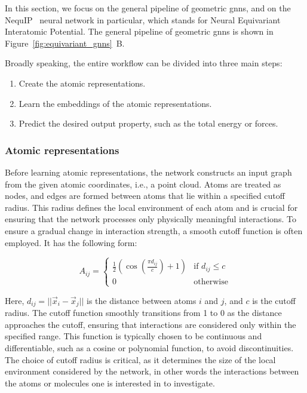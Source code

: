 In this section, we focus on the general pipeline of geometric \acp{gnn}, and on the NequIP~\citep{batznerE3equivariantGraphNeural2022} neural network in particular, which stands for Neural Equivariant Interatomic Potential. The general pipeline of geometric \acp{gnn} is shown in Figure~\ref{fig:equivariant_gnns}~B.

Broadly speaking, the entire workflow can be divided into three main steps:
\begin{enumerate}
    \item Create the atomic representations.
    \item Learn the embeddings of the atomic representations.
    \item Predict the desired output property, such as the total energy or forces.
\end{enumerate}

\subsubsection{Atomic representations}
Before learning atomic representations, the network constructs an input graph from the given atomic coordinates, i.e., a point cloud. Atoms are treated as nodes, and edges are formed between atoms that lie within a specified cutoff radius. This radius defines the local environment of each atom and is crucial for ensuring that the network processes only physically meaningful interactions. To ensure a gradual change in interaction strength, a smooth cutoff function is often employed. It has the following form:

\begin{equation}
    A_{ij} = \begin{cases}
    \frac{1}{2}\left(\cos\left(\frac{\pi d_{ij}}{c}\right) + 1\right) & \text{if } d_{ij} \leq c \\
    0 & \text{otherwise}
    \end{cases}
    \label{eq:smooth_cutoff}
\end{equation}

Here, $d_{ij} = ||\vec{x}_i - \vec{x}_j||$ is the distance between atoms $i$ and $j$, and $c$ is the cutoff radius. The cutoff function smoothly transitions from 1 to 0 as the distance approaches the cutoff, ensuring that interactions are considered only within the specified range. This function is typically chosen to be continuous and differentiable, such as a cosine or polynomial function, to avoid discontinuities. The choice of cutoff radius is critical, as it determines the size of the local environment considered by the network, in other words the interactions between the atoms or molecules one is interested in to investigate.

